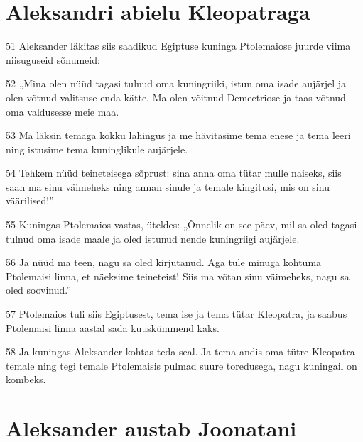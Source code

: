 \section*{Aleksandri abielu Kleopatraga}

\par 51 Aleksander läkitas siis saadikud Egiptuse kuninga Ptolemaiose juurde viima niisuguseid sõnumeid:
\par 52 „Mina olen nüüd tagasi tulnud oma kuningriiki, istun oma isade aujärjel ja olen võtnud valitsuse enda kätte. Ma olen võitnud Demeetriose ja taas võtnud oma valdusesse meie maa.
\par 53 Ma läksin temaga kokku lahingus ja me hävitasime tema enese ja tema leeri ning istusime tema kuninglikule aujärjele.
\par 54 Tehkem nüüd teineteisega sõprust: sina anna oma tütar mulle naiseks, siis saan ma sinu väimeheks ning annan sinule ja temale kingitusi, mis on sinu väärilised!”
\par 55 Kuningas Ptolemaios vastas, üteldes: „Õnnelik on see päev, mil sa oled tagasi tulnud oma isade maale ja oled istunud nende kuningriigi aujärjele.
\par 56 Ja nüüd ma teen, nagu sa oled kirjutanud. Aga tule minuga kohtuma Ptolemaisi linna, et näeksime teineteist! Siis ma võtan sinu väimeheks, nagu sa oled soovinud.”
\par 57 Ptolemaios tuli siis Egiptusest, tema ise ja tema tütar Kleopatra, ja saabus Ptolemaisi linna aastal sada kuuskümmend kaks.
\par 58 Ja kuningas Aleksander kohtas teda seal. Ja tema andis oma tütre Kleopatra temale ning tegi temale Ptolemaisis pulmad suure toredusega, nagu kuningail on kombeks. 

\section*{Aleksander austab Joonatani}

